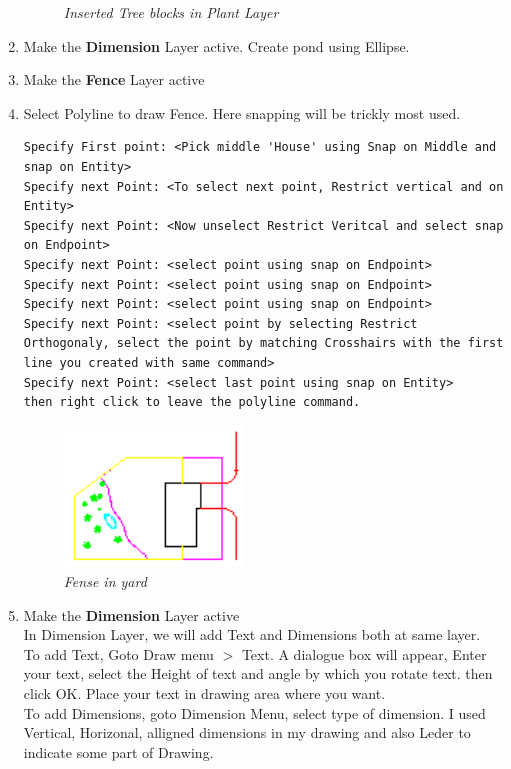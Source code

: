 \begin{enumerate}
{\begin{figure}[h!]
       \caption{\small \sl Inserted Tree blocks in Plant Layer}
       \end{figure}}
\item{Make the \textbf{Dimension} Layer active. Create pond using Ellipse.}
\item{Make the \textbf{Fence} Layer active}
\item{Select Polyline to draw Fence. Here snapping will be trickly most used. 
\begin{verbatim}
Specify First point: <Pick middle 'House' using Snap on Middle and snap on Entity>
Specify next Point: <To select next point, Restrict vertical and on Entity>
Specify next Point: <Now unselect Restrict Veritcal and select snap on Endpoint>
Specify next Point: <select point using snap on Endpoint>
Specify next Point: <select point using snap on Endpoint>
Specify next Point: <select point using snap on Endpoint>
Specify next Point: <select point by selecting Restrict Orthogonaly, select the point by matching Crosshairs with the first line you created with same command>
Specify next Point: <select last point using snap on Entity>
then right click to leave the polyline command.
\end{verbatim}
\begin{figure}[h!]
       \centering\includegraphics[width=180px]{./images-yard/fense.png}
       \caption{\small \sl Fense in yard}
       \end{figure}}    
\item{Make the \textbf{Dimension} Layer active\\
In Dimension Layer, we will add Text and Dimensions both at same layer.\\
To add Text, Goto Draw menu $>$ Text. A dialogue box will appear, Enter your text, select the Height of text and angle by which you rotate text. then click OK. Place your text in drawing area where you want.\\
To add Dimensions, goto Dimension Menu, select type of dimension. I used Vertical, Horizonal, alligned dimensions in my drawing and also Leder to indicate some part of Drawing.
\begin{figure}[h!]

\end{figure}}
\end{enumerate}
